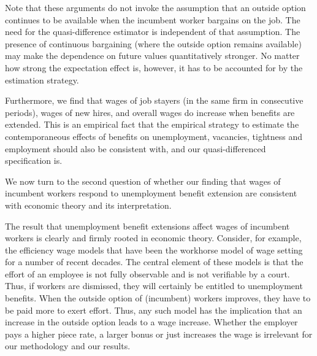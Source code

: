\documentclass[12pt]{article}
\newcommand{\1}{\mathbf{1}}
\begin{document}
\begin{appendix}
Note that these arguments do not invoke the assumption that an outside option continues to be available when the incumbent worker bargains on the job. The need for the quasi-difference estimator is independent of that assumption. The presence of continuous bargaining (where the outside option remains available) may make the dependence on future values quantitatively stronger. No matter how strong the expectation effect is, however, it has to be accounted for by the estimation strategy.

Furthermore, we find that wages of job stayers (in the same firm in consecutive periods), wages of new hires, and overall wages do increase when benefits are extended. This is an empirical fact that the empirical strategy to estimate the contemporaneous effects of benefits on unemployment, vacancies, tightness and employment should also be consistent with, and our quasi-differenced specification is.

We now turn to the second question of whether our finding that wages of incumbent workers respond to unemployment benefit extension are consistent with economic theory and its interpretation.

The result that unemployment benefit extensions affect wages of incumbent workers is clearly and firmly rooted in economic theory. Consider, for example, the efficiency wage models that have been the workhorse model of wage setting for a number of recent decades. The central element of these models is that the effort of an employee is not fully observable and is not verifiable by a court. Thus, if workers are dismissed, they will certainly be entitled to unemployment benefits. When the outside option of (incumbent) workers improves, they have to be paid more to exert effort. Thus, any such model has the implication that an increase in the outside option leads to a wage increase. Whether the employer pays a higher piece rate, a larger bonus or just increases the wage is irrelevant for our methodology and our results. %


\end{appendix}
\end{document}
